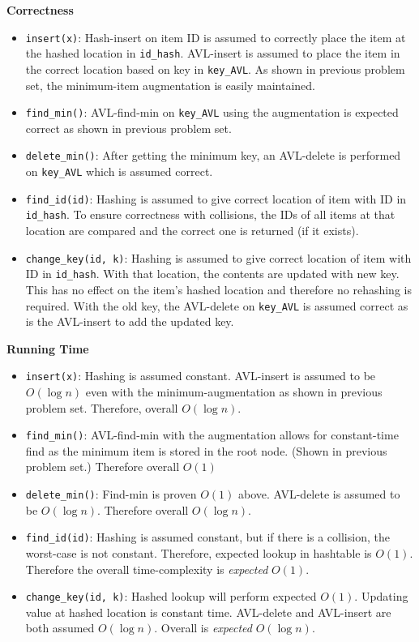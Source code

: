 \documentclass[12pt,twoside]{article}
\begin{document}
\begin{problems}
    {\bf Correctness}
    \begin{itemize}
        \item {\tt insert(x)}: Hash-insert on item ID is assumed to correctly
        place the item at the hashed location in {\tt id\_hash}. AVL-insert
        is assumed to place the item in the correct location based on key in
        {\tt key\_AVL}. As shown in previous problem set, the minimum-item
        augmentation is easily maintained.
        \item {\tt find\_min()}: AVL-find-min on {\tt key\_AVL} using the
        augmentation is expected correct as shown in previous problem set.
        \item {\tt delete\_min()}: After getting the minimum key, an
        AVL-delete is performed on {\tt key\_AVL} which is assumed correct.
        \item {\tt find\_id(id)}: Hashing is assumed to give correct location
        of item with ID in {\tt id\_hash}. To ensure correctness with
        collisions, the IDs of all items at that location are compared and
        the correct one is returned (if it exists).
        \item {\tt change\_key(id, k)}: Hashing is assumed to give correct
        location of item with ID in {\tt id\_hash}. With that location, the
        contents are updated with new key. This has no effect on the item's
        hashed location and therefore no rehashing is required. With the old
        key, the AVL-delete on {\tt key\_AVL} is assumed correct as is the
        AVL-insert to add the updated key.
    \end{itemize}

    {\bf Running Time}
    \begin{itemize}
        \item {\tt insert(x)}: Hashing is assumed constant. AVL-insert is
        assumed to be $O(\log n)$ even with the minimum-augmentation as shown
        in previous problem set. Therefore, overall $O(\log n)$.
        \item {\tt find\_min()}: AVL-find-min with the augmentation allows
        for constant-time find as the minimum item is stored in the root
        node. (Shown in previous problem set.) Therefore overall $O(1)$
        \item {\tt delete\_min()}: Find-min is proven $O(1)$ above.
        AVL-delete is assumed to be $O(\log n)$. Therefore overall $O(\log n)$.
        \item {\tt find\_id(id)}: Hashing is assumed constant, but if there
        is a collision, the worst-case is not constant. Therefore, expected
        lookup in hashtable is $O(1)$. Therefore the overall time-complexity
        is {\it expected} $O(1)$.
        \item {\tt change\_key(id, k)}: Hashed lookup will perform expected
        $O(1)$. Updating value at hashed location is constant time.
        AVL-delete and AVL-insert are both assumed $O(\log n)$. Overall is
        {\it expected} $O(\log n)$.
    \end{itemize}


\end{problems}
\end{document}
